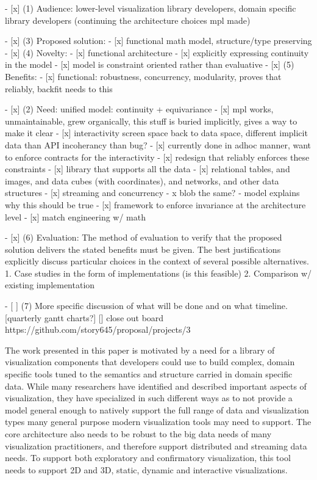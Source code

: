 
- [x] (1) Audience: lower-level visualization library developers, domain specific library developers (continuing the architecture choices mpl made)

- [x] (3) Proposed solution: 
    - [x] functional math model, structure/type preserving 
-  [x] (4) Novelty:
    - [x] functional architecture
    - [x] explicitly expressing continuity in the model
    - [x] model is constraint oriented rather than evaluative
- [x] (5) Benefits: 
    - [x] functional: robustness, concurrency, modularity, proves that reliably, backfit needs to this 

- [x] (2) Need: unified model: continuity + equivariance 
    - [x] mpl works, unmaintainable, grew organically, this stuff is buried implicitly, gives a way to make it clear
    - [x] interactivity screen space back to data space, different implicit data than API incoherancy than bug?
        - [x] currently done in adhoc manner, want to enforce contracts for the interactivity 
    - [x] redesign that reliably enforces these constraints 
    - [x] library that supports all the data 
        - [x] relational tables, and images, and data cubes (with coordinates), and networks, and other data structures
        - [x] streaming and concurrency 
        - x blob the same? - model explains why this should be true
    - [x] framework to enforce invariance at the architecture level
    - [x] match engineering w/ math

- [x] (6) Evaluation: The method of evaluation to verify that the proposed solution delivers the stated benefits must be given.
        The best justifications explicitly discuss particular choices in the context of several possible alternatives.
        1. Case studies in the form of implementations (is this feasible) 
        2. Comparison w/ existing implementation     

- [ ] (7) More specific discussion of what will be done and on what timeline.
        [quarterly gantt charts?]
[] close out board https://github.com/story645/proposal/projects/3



The work presented in this paper is motivated by a need for a library of visualization components that developers could use to build complex, domain specific tools tuned to the semantics and structure carried in domain specific data. While many researchers have identified and described important aspects of visualization, they have specialized in such different ways as to not provide a model general enough to natively support the full range of data and visualization types many general purpose modern visualization tools may need to support. The core architecture also needs to be robust to the big data needs of many visualization practitioners, and therefore support distributed and streaming data needs. To support both exploratory and confirmatory visualization\cite{tukeyWeNeedBoth1980}, this tool needs to support 2D and 3D, static, dynamic and interactive visualizations. 

